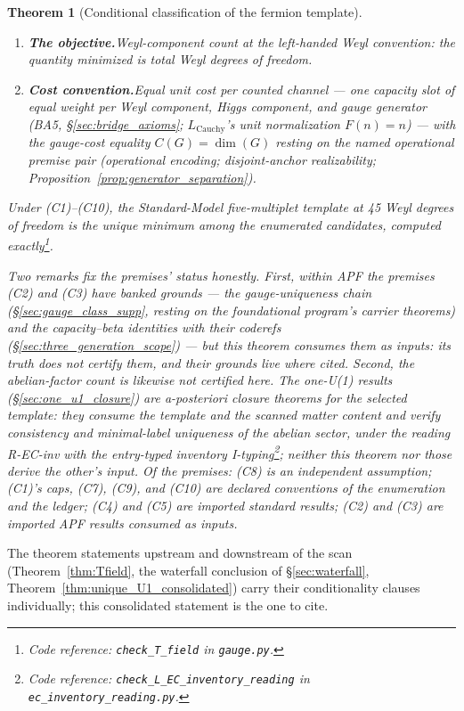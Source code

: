 \documentclass[11pt]{article}
\newtheorem{theorem}{Theorem}[section]
\theoremstyle{definition}
\newcommand{\coderef}[2]{\footnote{Code reference: \texttt{#1} in \texttt{#2}.}}
\begin{document}
\begin{theorem}[Conditional classification of the fermion template]
\begin{enumerate}[label=(C\arabic*),nosep]
  both directions\coderef{check\_L\_F6\_not\_from\_EC}{ec\_inventory\_reading.py}.
  \item \textbf{The objective.}\quad Weyl-component count at the
  left-handed Weyl convention: the quantity minimized is total Weyl
  degrees of freedom.
  \item \textbf{Cost convention.}\quad Equal unit cost per counted
  channel --- one capacity slot of equal weight per Weyl component,
  Higgs component, and gauge generator (BA5,
  \S\ref{sec:bridge_axioms}; $L_{\mathrm{Cauchy}}$'s unit
  normalization $F(n)=n$) --- with the gauge-cost equality
  $C(G) = \dim(G)$ resting on the named operational premise pair
  (operational encoding; disjoint-anchor realizability;
  Proposition~\ref{prop:generator_separation}).
\end{enumerate}
Under (C1)--(C10), the Standard-Model five-multiplet template at 45
Weyl degrees of freedom is the unique minimum among the enumerated
candidates, computed
exactly\coderef{check\_T\_field}{gauge.py}.

Two remarks fix the premises' status honestly.  First, within APF the
premises (C2) and (C3) have banked grounds --- the gauge-uniqueness
chain (\S\ref{sec:gauge_class_supp}, resting on the foundational
program's carrier theorems) and the capacity--beta identities with
their coderefs (\S\ref{sec:three_generation_scope}) --- but this
theorem consumes them as \emph{inputs}: its truth does not certify
them, and their grounds live where cited.  Second, the abelian-factor
count is likewise not certified here.  The one-U(1) results
(\S\ref{sec:one_u1_closure}) are a-posteriori closure theorems for
the selected template: they consume the template and the scanned
matter content and verify consistency and minimal-label uniqueness of
the abelian sector, under the reading R-EC-inv with the entry-typed
inventory
I-typing\coderef{check\_L\_EC\_inventory\_reading}{ec\_inventory\_reading.py};
neither this theorem nor those derive the other's input.  Of the
premises: (C8) is an independent assumption; (C1)'s caps, (C7), (C9),
and (C10) are declared conventions of the enumeration and the ledger;
(C4) and (C5) are imported standard results; (C2) and (C3) are
imported APF results consumed as inputs.
\end{theorem}

\noindent The theorem statements upstream and downstream of the scan
(Theorem~\ref{thm:Tfield}, the waterfall conclusion of
\S\ref{sec:waterfall}, Theorem~\ref{thm:unique_U1_consolidated}) carry
their conditionality clauses individually; this consolidated statement
is the one to cite.
\end{document}
